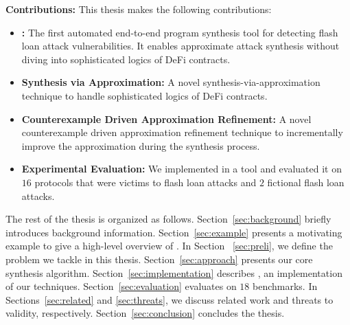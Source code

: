 \noindent \textbf{Contributions:}
This thesis makes the following contributions:
\begin{itemize}
\item \textbf{\name:} The first automated
end-to-end program synthesis tool for detecting flash loan attack
vulnerabilities. It enables approximate attack synthesis 
without diving into sophisticated logics of DeFi contracts. 

\item \textbf{Synthesis via Approximation:} A novel synthesis-via-approximation technique to handle
        sophisticated logics of DeFi contracts. 

\item \textbf{Counterexample Driven Approximation Refinement:} A novel counterexample driven approximation refinement technique to
        incrementally improve the approximation during the synthesis process.
\item \textbf{Experimental Evaluation:} 
We implemented {\name} in a tool and evaluated it on $16$ protocols that were victims to flash
loan attacks and $2$ fictional flash loan attacks. 
\end{itemize}

The rest of the thesis is organized as follows. Section~\ref{sec:background} briefly introduces background information. 
Section~\ref{sec:example} 
presents a motivating example to give a high-level overview of {\name}. 
In Section ~\ref{sec:preli}, we define the problem we tackle in this thesis. 
Section~\ref{sec:approach} presents our core synthesis algorithm.
Section~\ref{sec:implementation} describes {\name}, an implementation of our techniques. 
Section~\ref{sec:evaluation} evaluates {\name} on $18$ benchmarks. 
In Sections~\ref{sec:related} and \ref{sec:threats}, 
we discuss related work and threats to validity, respectively.  
Section~\ref{sec:conclusion} concludes the thesis.
